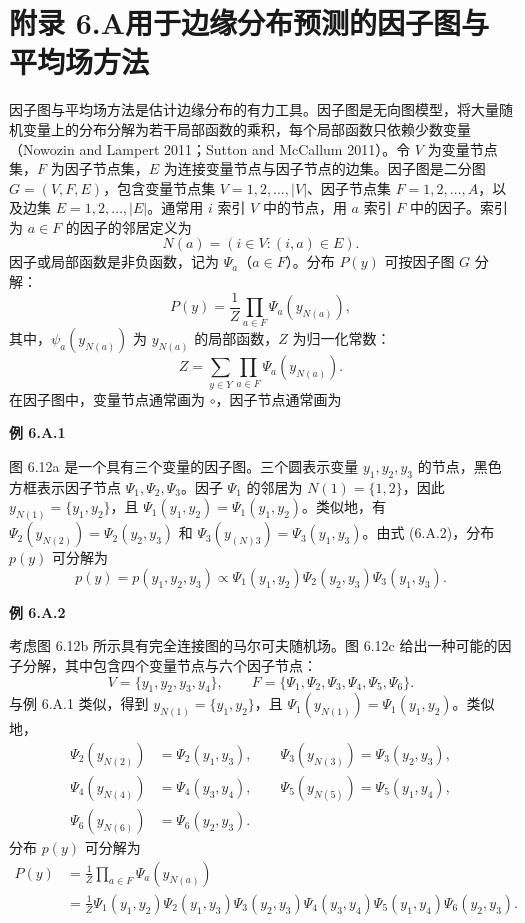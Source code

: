 \section*{附录 6.A\quad 用于边缘分布预测的因子图与平均场方法}

因子图与平均场方法是估计边缘分布的有力工具。因子图是无向图模型，将大量随机变量上的分布分解为若干局部函数的乘积，每个局部函数只依赖少数变量（Nowozin and Lampert 2011；Sutton and McCallum 2011）。令 $V$ 为变量节点集，$F$ 为因子节点集，$E$ 为连接变量节点与因子节点的边集。因子图是二分图 $G=(V,F,E)$，包含变量节点集 $V=1,2,\ldots,|V|$、因子节点集 $F=1,2,\ldots,A$，以及边集 $E=1,2,\ldots,|E|$。通常用 $i$ 索引 $V$ 中的节点，用 $a$ 索引 $F$ 中的因子。索引为 $a\in F$ 的因子的邻居定义为
\begin{equation}
N(a)=(i\in V:(i,a)\in E).
\tag{6.A.1}
\end{equation}
因子或局部函数是非负函数，记为 $\Psi_a$（$a\in F$）。分布 $P(y)$ 可按因子图 $G$ 分解：
\begin{equation}
P(y)=\frac1Z\prod_{a\in F}\Psi_a(y_{N(a)}),
\tag{6.A.2}
\end{equation}
其中，$\psi_a(y_{N(a)})$ 为 $y_{N(a)}$ 的局部函数，$Z$ 为归一化常数：
\begin{equation}
Z=\sum_{y\in Y}\prod_{a\in F}\Psi_a(y_{N(a)}).
\tag{6.A.3}
\end{equation}
在因子图中，变量节点通常画为 $\circ$，因子节点通常画为

\noindent\textbf{例 6.A.1}

图 6.12a 是一个具有三个变量的因子图。三个圆表示变量 $y_1,y_2,y_3$ 的节点，黑色方框表示因子节点 $\Psi_1,\Psi_2,\Psi_3$。因子 $\Psi_1$ 的邻居为 $N(1)=\{1,2\}$，因此 $y_{N(1)}=\{y_1,y_2\}$，且 $\Psi_1(y_1,y_2)=\Psi_1(y_1,y_2)$。类似地，有 $\Psi_2(y_{N(2)})=\Psi_2(y_2,y_3)$ 和 $\Psi_3(y_{(N)3})=\Psi_3(y_1,y_3)$。由式 (6.A.2)，分布 $p(y)$ 可分解为
\[
p(y)=p(y_1,y_2,y_3)\propto\Psi_1(y_1,y_2)\Psi_2(y_2,y_3)\Psi_3(y_1,y_3).
\]

\noindent\textbf{例 6.A.2}

考虑图 6.12b 所示具有完全连接图的马尔可夫随机场。图 6.12c 给出一种可能的因子分解，其中包含四个变量节点与六个因子节点：
\[
V=\{y_1,y_2,y_3,y_4\},\qquad F=\{\Psi_1,\Psi_2,\Psi_3,\Psi_4,\Psi_5,\Psi_6\}.
\]
与例 6.A.1 类似，得到 $y_{N(1)}=\{y_1,y_2\}$，且 $\Psi_1(y_{N(1)})=\Psi_1(y_1,y_2)$。类似地，
\[
\begin{aligned}
\Psi_2(y_{N(2)})&=\Psi_2(y_1,y_3),\qquad\Psi_3(y_{N(3)})=\Psi_3(y_2,y_3),\\
\Psi_4(y_{N(4)})&=\Psi_4(y_3,y_4),\qquad\Psi_5(y_{N(5)})=\Psi_5(y_1,y_4),\\
\Psi_6(y_{N(6)})&=\Psi_6(y_2,y_3).
\end{aligned}
\]
分布 $p(y)$ 可分解为
\[
\begin{aligned}
P(y)&=\frac1Z\prod_{a\in F}\Psi_a(y_{N(a)})\\
&=\frac1Z\Psi_1(y_1,y_2)\Psi_2(y_1,y_3)\Psi_3(y_2,y_3)\Psi_4(y_3,y_4)\Psi_5(y_1,y_4)\Psi_6(y_2,y_3).
\end{aligned}
\]

